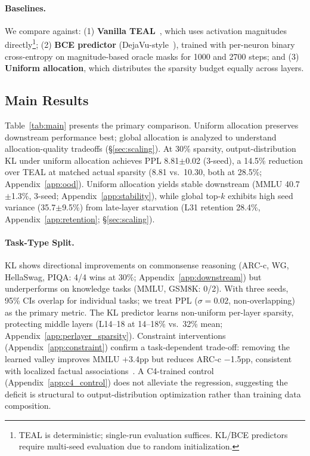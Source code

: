 \paragraph{Baselines.}
We compare against: (1) \textbf{Vanilla TEAL}~\cite{liu2025teal}, which uses activation magnitudes directly\footnote{TEAL is deterministic; single-run evaluation suffices. KL/BCE predictors require multi-seed evaluation due to random initialization.}; (2) \textbf{BCE predictor} (DejaVu-style~\cite{liu2023dejavu}), trained with per-neuron binary cross-entropy on magnitude-based oracle masks for 1000 and 2700 steps; and (3) \textbf{Uniform allocation}, which distributes the sparsity budget equally across layers.


\subsection{Main Results}

Table~\ref{tab:main} presents the primary comparison. Uniform allocation preserves downstream performance best; global allocation is analyzed to understand allocation-quality tradeoffs (\S\ref{sec:scaling}).
At 30\% sparsity, output-distribution KL under uniform allocation achieves PPL 8.81$\pm$0.02 (3-seed), a 14.5\% reduction over TEAL at matched actual sparsity (8.81 vs.\ 10.30, both at 28.5\%; Appendix~\ref{app:ood}).
Uniform allocation yields stable downstream (MMLU 40.7$\pm$1.3\%, 3-seed; Appendix~\ref{app:stability}), while global top-$k$ exhibits high seed variance (35.7$\pm$9.5\%) from late-layer starvation (L31 retention 28.4\%, Appendix~\ref{app:retention}; \S\ref{sec:scaling}). %

\paragraph{Task-Type Split.}
KL shows directional improvements on commonsense reasoning (ARC-c, WG, HellaSwag, PIQA: 4/4 wins at 30\%; Appendix~\ref{app:downstream}) but underperforms on knowledge tasks (MMLU, GSM8K: 0/2).
With three seeds, 95\% CIs overlap for individual tasks; we treat PPL ($\sigma{=}0.02$, non-overlapping) as the primary metric.
The KL predictor learns non-uniform per-layer sparsity, protecting middle layers (L14--18 at 14--18\% vs.\ 32\% mean; Appendix~\ref{app:perlayer_sparsity}).
Constraint interventions (Appendix~\ref{app:constraint}) confirm a task-dependent trade-off: removing the learned valley improves MMLU +3.4pp but reduces ARC-c $-$1.5pp, consistent with localized factual associations~\cite{geva2023dissecting}. A C4-trained control (Appendix~\ref{app:c4_control}) does not alleviate the regression, suggesting the deficit is structural to output-distribution optimization rather than training data composition. %


